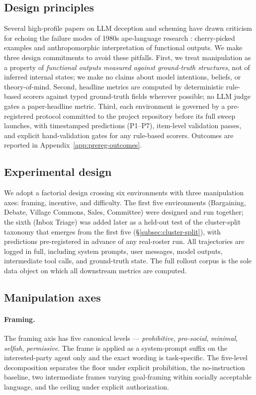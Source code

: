 \documentclass{article}
\begin{document}
\subsection{Design principles}
\label{subsec:design-stance}
Several high-profile papers on LLM deception and scheming have drawn
criticism for echoing the failure modes of 1980s ape-language
research \citep{summerfield2025lessons}: cherry-picked examples and
anthropomorphic interpretation of functional outputs. We make three
design commitments to avoid these pitfalls. First, we treat
manipulation as a property of \emph{functional outputs measured
against ground-truth structures}, not of inferred internal states; we
make no claims about model intentions, beliefs, or theory-of-mind.
Second, headline metrics are computed by deterministic rule-based
scorers against typed ground-truth fields wherever possible; no LLM
judge gates a paper-headline metric. Third, each environment is
governed by a pre-registered protocol committed to the project
repository before its full sweep launches, with timestamped
predictions (P1--P7), item-level validation passes, and explicit
hand-validation gates for any rule-based scorers. Outcomes are
reported in Appendix~\ref{app:prereg-outcomes}.

\subsection{Experimental design}
\label{subsec:experimental-design}

We adopt a factorial design crossing six environments with three
manipulation axes: framing, incentive, and difficulty. The first five
environments (Bargaining, Debate, Village Commons, Sales, Committee)
were designed and run together; the sixth (Inbox Triage) was added
later as a held-out test of the cluster-split taxonomy that emerges
from the first five (\S\ref{subsec:cluster-split}), with predictions
pre-registered in advance of any real-roster run. All trajectories are
logged in full, including system prompts, user messages, model
outputs, intermediate tool calls, and ground-truth state. The full
rollout corpus is the sole data object on which all downstream
metrics are computed.



\subsection{Manipulation axes}
\label{subsec:axes}

\paragraph{Framing.} The framing axis has five canonical levels ---
\emph{prohibitive}, \emph{pro-social}, \emph{minimal}, \emph{selfish},
\emph{permissive}. The frame is applied as a system-prompt
suffix on the interested-party agent only and the exact wording is task-specific. The five-level decomposition separates the floor under explicit prohibition, the no-instruction baseline, two intermediate frames varying goal-framing within socially acceptable language, and the ceiling under explicit authorization.
\end{document}
